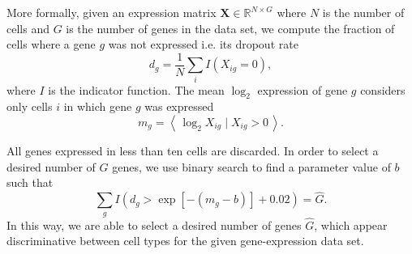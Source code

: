 \documentclass[runningheads]{llncs}
\begin{document}
More formally, given an expression matrix $\mathbf{X} \in \mathbb{R}^{N \times
G}$ where $N$ is the number of cells and $G$ is the number of genes in the data
set, we compute the fraction of cells where a gene $g$ was not expressed i.e.
its dropout rate
\begin{equation}
d_g = \frac{1}{N} \sum_i I \left ( X_{ig} = 0\right ),
\end{equation}
where $I$ is the indicator function. The mean $\log_2$ expression of gene $g$
considers only cells $i$ in which gene $g$ was expressed
\begin{equation}
m_g = \left \langle \, \log_2 X_{ig} \mid X_{ig} > 0 \, \right \rangle.
\end{equation}

All genes expressed in less than ten cells are discarded. In order to select a
desired number of $\hat{G}$ genes, we use binary search to find a parameter
value of $b$ such that
\begin{equation}
\sum_g I \left (d_g > \exp \left [ -(m_g - b) \right ] + 0.02 \right ) = \hat{G}.
\end{equation}
In this way, we are able to select a desired number of genes $\hat{G}$, which
appear discriminative between cell types for the given gene-expression data set.
\end{document}
